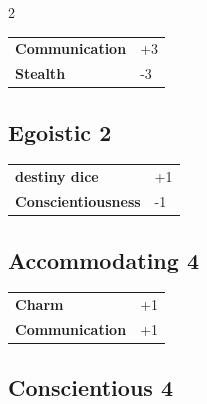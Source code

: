 \begin{multicols}{2}
\begin{tcolorbox}
\begin{tabular}{@{}ll@{}}
    \textbf{Communication} & +3\\
    \textbf{Stealth} & -3\\
\end{tabular}


\end{tcolorbox}

\begin{tcolorbox}
    \subsection*{Egoistic \hfill \small{2 }}
    \tcblower




\begin{tabular}{@{}ll@{}}
    \textbf{destiny dice} & +1\\
    \textbf{Conscientiousness} & -1\\
\end{tabular}


\end{tcolorbox}

\begin{tcolorbox}
    \subsection*{Accommodating \hfill \small{4 }}
    \tcblower




\begin{tabular}{@{}ll@{}}
    \textbf{Charm} & +1\\
    \textbf{Communication} & +1\\
\end{tabular}


\end{tcolorbox}

\begin{tcolorbox}
    \subsection*{Conscientious \hfill \small{4 }}
    \tcblower





\end{tcolorbox}
\end{multicols}
